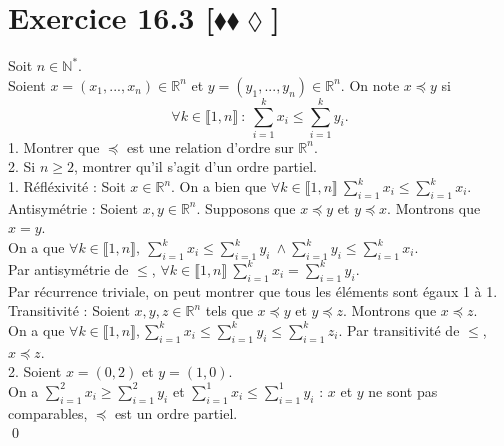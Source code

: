 \documentclass[10pt]{article}
\begin{document}
\section*{Exercice 16.3 [$\blacklozenge\blacklozenge\lozenge$]}
\begin{tcolorbox}[enhanced, width=7.6in, center, size=fbox, fontupper=\large, drop shadow southwest]
    Soit $n\in\mathbb{N}^*$.\\
    Soient $x=(x_1,...,x_n)\in\mathbb{R}^n$ et $y=(y_1,...,y_n)\in\mathbb{R}^n$. On note $x \preceq y$ si
    \begin{equation*}
        \forall k \in \llbracket 1, n \rrbracket ~ : ~ \sum_{i=1}^kx_i \leq \sum_{i=1}^ky_i.
    \end{equation*}
    1. Montrer que $\preceq$ est une relation d'ordre sur $\mathbb{R}^n$.\\
    2. Si $n \geq 2$, montrer qu'il s'agit d'un ordre partiel.\\[0.2cm]
    1. Réfléxivité : Soit $x\in\mathbb{R}^n$. On a bien que $\forall k \in \llbracket 1,n \rrbracket ~\sum_{i=1}^kx_i \leq \sum_{i=1}^kx_i$.\\[0.1cm]
    Antisymétrie : Soient $x,y\in\mathbb{R}^n$. Supposons que $x \preceq y$ et $y \preceq x$. Montrons que $x=y$.\\
    On a que $\forall k \in \llbracket 1, n \rrbracket, ~ \sum_{i=1}^kx_i \leq \sum_{i=1}^ky_i ~ \wedge \sum_{i=1}^ky_i \leq \sum_{i=1}^kx_i$.\\
    Par antisymétrie de $\leq$, $\forall k \in \llbracket 1, n \rrbracket ~ \sum_{i=1}^kx_i = \sum_{i=1}^k y_i$.\\
    Par récurrence triviale, on peut montrer que tous les éléments sont égaux 1 à 1.\\[0.15cm]
    Transitivité : Soient $x,y,z \in \mathbb{R}^n$ tels que $x \preceq y$ et $y \preceq z$. Montrons que $x \preceq z$.\\
    On a que $\forall k \in \llbracket 1, n \rrbracket, \sum_{i=1}^kx_i \leq \sum_{i=1}^ky_i\leq\sum_{i=1}^kz_i$. Par transitivité de $\leq$, $x \preceq z$.\\[0.2cm]
    2. Soient $x=(0,2)$ et $y=(1,0)$.\\
    On a $\sum_{i=1}^2x_i \geq \sum_{i=1}^2y_i$ et $\sum_{i=1}^1x_i \leq \sum_{i=1}^1y_i$ : $x$ et $y$ ne sont pas comparables, $\preceq$ est un ordre partiel.\\
    \qed
\end{tcolorbox}
\end{document}
